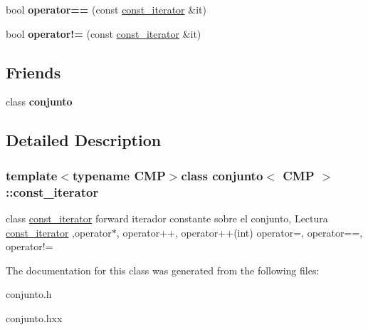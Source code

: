\begin{DoxyCompactItemize}
\item 
\hypertarget{classconjunto_1_1const__iterator_aa51158e92aeeec4c65ba9a4ba8047cbd}{}bool {\bfseries operator==} (const \hyperlink{classconjunto_1_1const__iterator}{const\+\_\+iterator} \&it)\label{classconjunto_1_1const__iterator_aa51158e92aeeec4c65ba9a4ba8047cbd}

\item 
\hypertarget{classconjunto_1_1const__iterator_a433c34257914c399d1eff2a1c9b1030d}{}bool {\bfseries operator!=} (const \hyperlink{classconjunto_1_1const__iterator}{const\+\_\+iterator} \&it)\label{classconjunto_1_1const__iterator_a433c34257914c399d1eff2a1c9b1030d}

\end{DoxyCompactItemize}
\subsection*{Friends}
\begin{DoxyCompactItemize}
\item 
\hypertarget{classconjunto_1_1const__iterator_a42fdcda39c77eabd7380e29fcdbe5dd2}{}class {\bfseries conjunto}\label{classconjunto_1_1const__iterator_a42fdcda39c77eabd7380e29fcdbe5dd2}

\end{DoxyCompactItemize}


\subsection{Detailed Description}
\subsubsection*{template$<$typename C\+M\+P$>$class conjunto$<$ C\+M\+P $>$\+::const\+\_\+iterator}

class \hyperlink{classconjunto_1_1const__iterator}{const\+\_\+iterator} forward iterador constante sobre el conjunto, Lectura \hyperlink{classconjunto_1_1const__iterator}{const\+\_\+iterator} ,operator$\ast$, operator++, operator++(int) operator=, operator==, operator!= 

The documentation for this class was generated from the following files\+:\begin{DoxyCompactItemize}
\item 
conjunto.\+h\item 
conjunto.\+hxx\end{DoxyCompactItemize}
